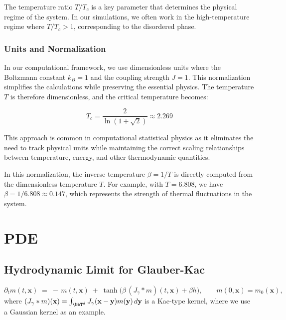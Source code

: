 \documentclass[11pt,a4paper]{article}
\begin{document}
The temperature ratio $T/T_c$ is a key parameter that determines the physical regime of the system. In our simulations, we often work in the high-temperature regime where $T/T_c > 1$, corresponding to the disordered phase.

\subsubsection{Units and Normalization}

In our computational framework, we use dimensionless units where the Boltzmann constant $k_B = 1$ and the coupling strength $J = 1$. This normalization simplifies the calculations while preserving the essential physics. The temperature $T$ is therefore dimensionless, and the critical temperature becomes:

\begin{equation}
T_c = \frac{2}{\ln(1 + \sqrt{2})} \approx 2.269
\end{equation}

This approach is common in computational statistical physics as it eliminates the need to track physical units while maintaining the correct scaling relationships between temperature, energy, and other thermodynamic quantities.

In this normalization, the inverse temperature $\beta = 1/T$ is directly computed from the dimensionless temperature $T$. For example, with $T = 6.808$, we have $\beta = 1/6.808 \approx 0.147$, which represents the strength of thermal fluctuations in the system.

\section{PDE}

\subsection{Hydrodynamic Limit for Glauber-Kac}

\begin{equation}\label{eq:nonlocal}
    \partial_t m(t,\mathbf{x}) \;=\; -\,m(t,\mathbf{x})\;+\;\tanh\!\Big(\beta\, (J_\gamma * m)(t,\mathbf{x}) + \beta h\Big), \qquad m(0,\mathbf{x})=m_0(\mathbf{x}),
    \end{equation}
where $(J_\gamma * m)(\mathbf{x})=\int_{\bbT^d}J_\gamma(\mathbf{x}-\mathbf{y})m(\mathbf{y})\,d\mathbf{y}$ is a Kac-type kernel, where we use a Gaussian kernel as an example.  
\end{document}
